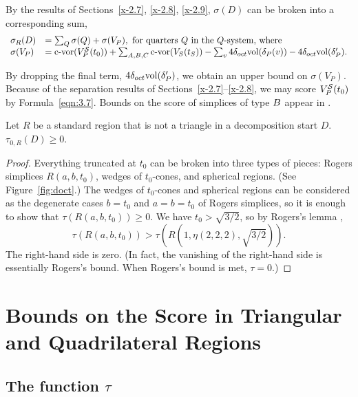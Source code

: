 By the results of Sections~\ref{x-2.7}, \ref{x-2.8}, \ref{x-2.9},
$\sigma(D)$ can be broken into a corresponding sum,
    $$
    \begin{array}{lll}
    \sigma_R(D) &= \sum_Q \sigma(Q) + \sigma(V_P),
                \hbox{ for quarters $Q$ in the $Q$-system, where}\\
    \sigma(V_P) &= {\operatorname{c-vor}}(V^{{\mathcal S}}_P(t_0))+  \sum_{A,B,C} {\operatorname{c-vor}}(V_S(t_S))
        - \sum_v 4\delta_{oct}{\operatorname{vol}}(\delta_P(v)) - 4\delta_{oct}{\operatorname{vol}}(\delta'_P).\\
    \end{array}
    $$

By dropping the final term, $4\delta_{oct}{\operatorname{vol}}(\delta'_P)$, we obtain
an upper bound on $\sigma(V_P)$.  Because of the separation
results of Sections~\ref{x-2.7}--\ref{x-2.8},  we may score
$V^{{\mathcal S}}_P(t_0)$ by Formula~\ref{eqn:3.7}. Bounds on the score of
simplices of type $B$ appear in .

\begin{lemma}
    \label{lemma:tau-positive}
    Let $R$ be a standard region that is not a triangle in a
    decomposition start $D$.
    $\tau_{0,R}(D)\ge 0$.
\end{lemma}

\begin{proof}
Everything truncated at $t_0$ can be broken into three types of
pieces: Rogers simplices $R(a,b,t_0)$, wedges of $t_0$-cones, and
spherical regions. (See Figure~\ref{fig:doct}.) The wedges of
$t_0$-cones and spherical regions can be considered as the
degenerate cases $b=t_0$ and $a=b=t_0$ of Rogers simplices, so it
is enough to show that $\tau(R(a,b,t_0))\ge 0$. We have
$t_0>\sqrt{3/2}$, so by Rogers's lemma \cite[Lemma~8.6.2]{part1},
    $$\tau(R(a,b,t_0))>\tau(R(1,\eta(2,2,2),\sqrt{3/2})).$$
The right-hand side is zero. (In fact, the vanishing of the
right-hand side is essentially Rogers's bound.   When Rogers's
bound is met, $\tau=0$.)
\end{proof}


\chapter{Bounds on the Score in Triangular and Quadrilateral Regions}
    \label{sec:intro}




\section{The function $\tau$}

